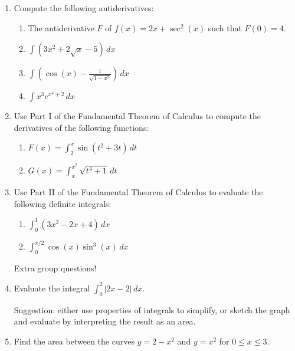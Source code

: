 \documentclass[12pt]{article}
\newcommand{\points}[1]{\marginpar{\hspace{24pt}[#1]}}
\newcommand{\di}{\displaystyle}
\newcommand{\abs}[1]{\lvert #1\rvert}
\begin{document}
 \begin{enumerate}
 \item  Compute the following antiderivatives:
 \begin{enumerate}
 \item The antiderivative $F$ of $f(x) = 2x+\sec^2(x)$ such that $F(0)=4$. \points{3}
 
 \vspace{4.5cm}
 
 \item $\di \int (3x^2+2\sqrt{x}-5)\,dx$\points{3}
 
 \vspace{4.5cm}
 
 \item $\di \int \left(\cos(x)-\frac{1}{\sqrt{1-x^2}}\right)\,dx$ \points{3}
 
 \vspace{4.5cm}
 
 \item $\di \int x^3 e^{x^4+2}\,dx$ \points{3}
 \end{enumerate}
 \newpage
 
 \item Use Part I of the Fundamental Theorem of Calculus to compute the derivatives of the following functions:
 \begin{enumerate}
 \item $\di F(x) = \int_2^x \sin(t^2+3t)\,dt$ \points{2}
 
 \vspace{3cm}
 
 \item $\di G(x) = \int_x^{x^2}\sqrt{t^4+1}\,dt$ \points{3}
 
 \vspace{4cm}
  \end{enumerate}
 \item Use Part II of the Fundamental Theorem of Calculus to evaluate the following definite integrals:
 \begin{enumerate}
 \item $\di \int_0^1\left(3x^2-2x+4\right)\,dx$ \points{3}
 
 \vspace{4cm}
 
 \item $\di \int_0^{\pi/2}\cos(x)\sin^3(x)\,dx$ \points{4}
 \end{enumerate}
 \newpage
 
 Extra group questions!
 
 \item Evaluate the integral $\di \int_0^2 \abs{2x-2}\,dx$. \points{3}
 
\noindent Suggestion: either use properties of integrals to simplify, or sketch the graph and evaluate by interpreting the result as an area.

\vspace{7cm}

 \item Find the area between the curves $y= 2-x^2$ and $y=x^2$ for $0\leq x\leq 3$. \points{3}
\end{enumerate}
\end{document}

